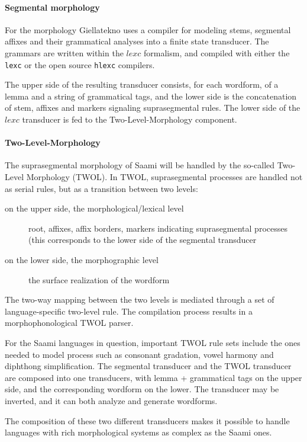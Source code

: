 \documentclass[a4paper,12pt]{article}
\begin{document}
\paragraph{Segmental morphology}
For the morphology Giellatekno uses a compiler for modeling stems, segmental affixes and their grammatical analyses into a finite state transducer. The grammars are written within the $lexc$ formalism, and compiled with either the \texttt{lexc} or the open source \texttt{hlexc} compilers. 

The upper side of the resulting transducer consists, for each wordform, of a lemma and a string of grammatical tags, and the lower side is the concatenation of stem, affixes and markers signaling suprasegmental rules. The lower side of the $lexc$ transducer is fed to the Two-Level-Morphology component.

\paragraph{Two-Level-Morphology}
The suprasegmental morphology of Saami will be handled by the so-called Two-Level Morphology (TWOL). In TWOL, suprasegmental processes are handled not as serial rules, but as a transition between two levels:
\begin{description}
\item[on the upper side, the morphological/lexical level] root, affixes, affix borders, markers indicating suprasegmental processes (this corresponds to the lower side of the segmental transducer
\item[on the lower side, the morphographic level] the surface realization of the wordform
\end{description}

The two-way mapping between the two levels is mediated through a set of language-specific two-level rule. The compilation process results in a morphophonological TWOL parser.

For the Saami languages in question, important TWOL rule sets include the ones needed to model process such as consonant gradation, vowel harmony and diphthong simplification. The segmental transducer and the TWOL transducer are composed into one transducers, with lemma + grammatical tags on the upper side, and the corresponding wordform on the lower. The transducer may be inverted, and it can both analyze and generate wordforms.

The composition of these two different transducers makes it possible to handle languages with rich morphological systems as complex as the Saami ones. 
\end{document}
